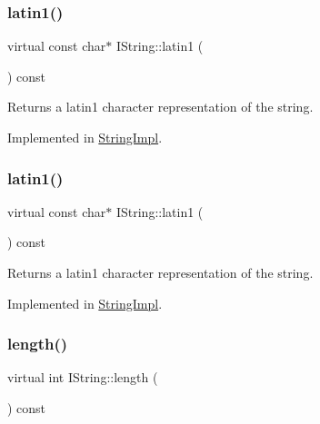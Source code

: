 \mbox{\label{class_i_string_aa4961cf1dde87d3308ec95430045b7db}} 
\subsubsection{\texorpdfstring{latin1()}{latin1()}\hspace{0.1cm}{\footnotesize\ttfamily [1/2]}}
{\footnotesize\ttfamily virtual const char$\ast$ I\+String\+::latin1 (\begin{DoxyParamCaption}{ }\end{DoxyParamCaption}) const\hspace{0.3cm}{\ttfamily [pure virtual]}}

Returns a latin1 character representation of the string. 

Implemented in \mbox{\hyperlink{class_string_impl_a4a71f742026854a0941e7fa829b47203}{String\+Impl}}.

\mbox{\label{class_i_string_aa4961cf1dde87d3308ec95430045b7db}} 
\subsubsection{\texorpdfstring{latin1()}{latin1()}\hspace{0.1cm}{\footnotesize\ttfamily [2/2]}}
{\footnotesize\ttfamily virtual const char$\ast$ I\+String\+::latin1 (\begin{DoxyParamCaption}{ }\end{DoxyParamCaption}) const\hspace{0.3cm}{\ttfamily [pure virtual]}}

Returns a latin1 character representation of the string. 

Implemented in \mbox{\hyperlink{class_string_impl_a4a71f742026854a0941e7fa829b47203}{String\+Impl}}.

\mbox{\label{class_i_string_acbd29581b11e69494ce0141e2425071a}} 
\subsubsection{\texorpdfstring{length()}{length()}\hspace{0.1cm}{\footnotesize\ttfamily [1/2]}}
{\footnotesize\ttfamily virtual int I\+String\+::length (\begin{DoxyParamCaption}{ }\end{DoxyParamCaption}) const\hspace{0.3cm}{\ttfamily [pure virtual]}}

